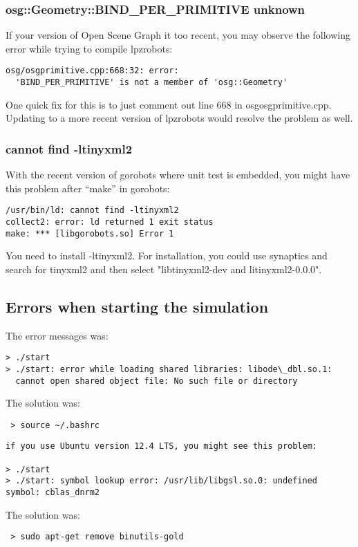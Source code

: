 \subsubsection{osg::Geometry::BIND\_PER\_PRIMITIVE unknown}
If your version of Open Scene Graph it too recent, you may observe the following
error while trying to compile lpzrobots:
\begin{lstlisting}
osg/osgprimitive.cpp:668:32: error: 
  'BIND_PER_PRIMITIVE' is not a member of 'osg::Geometry'
\end{lstlisting}
One quick fix for this is to just comment out line 668 in osg\/osgprimitive.cpp.
Updating to a more recent version of lpzrobots would resolve the problem as 
well.


\subsubsection{cannot find -ltinyxml2}
With the recent version of gorobots where unit test is embedded, you might have this problem after ``make'' in gorobots:
\begin{lstlisting}
/usr/bin/ld: cannot find -ltinyxml2
collect2: error: ld returned 1 exit status
make: *** [libgorobots.so] Error 1
\end{lstlisting}
You need to install -ltinyxml2. For installation, you could use synaptics and search for tinyxml2 and then select "libtinyxml2-dev and litinyxml2-0.0.0".


\subsection{Errors when starting the simulation}

The error messages was:

\begin{lstlisting}
> ./start
> ./start: error while loading shared libraries: libode\_dbl.so.1:
  cannot open shared object file: No such file or directory
\end{lstlisting}
The solution was:
\begin{lstlisting}
 > source ~/.bashrc
\end{lstlisting}


\begin{lstlisting}
if you use Ubuntu version 12.4 LTS, you might see this problem:

> ./start
> ./start: symbol lookup error: /usr/lib/libgsl.so.0: undefined symbol: cblas_dnrm2
\end{lstlisting}
The solution was:
\begin{lstlisting}
 > sudo apt-get remove binutils-gold
\end{lstlisting}




